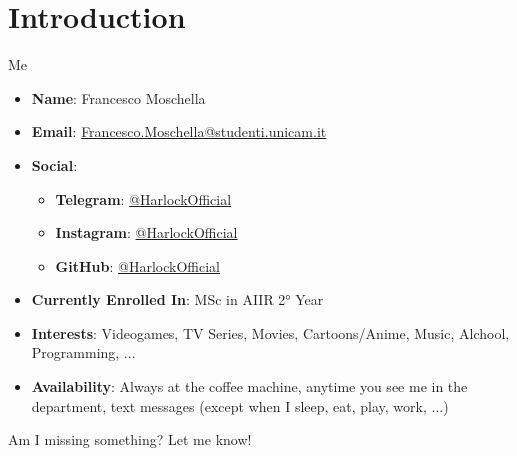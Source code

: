 \section{Introduction}
\begin{frame}{Me}
    \begin{itemize}
        \item \textbf{Name}: Francesco Moschella
        \item \textbf{Email}: \href{mailto:francesco.moschella@studenti.unicam.it}{Francesco.Moschella@studenti.unicam.it}
        \item \textbf{Social}:
        \begin{itemize}
            \item \textbf{Telegram}: \href{https://t.me/HarlockOfficial}{@HarlockOfficial}
            \item \textbf{Instagram}: \href{https://www.instagram.com/HarlockOfficial}{@HarlockOfficial}
            \item \textbf{GitHub}: \href{https://www.github.com/HarlockOfficial}{@HarlockOfficial}
    
        \end{itemize}
        \item \textbf{Currently Enrolled In}: MSc in AIIR 2° Year
        \item \textbf{Interests}: Videogames, TV Series, Movies, Cartoons/Anime, Music, Alchool, Programming, ...
        \item \textbf{Availability}: Always at the coffee machine, anytime you see me in the department, text messages (except when I sleep, eat, play, work, ...)
    \end{itemize}
    Am I missing something? Let me know!
\end{frame}
